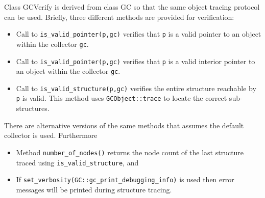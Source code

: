    Class {\sf GCVerify} is derived from class {\sf GC} so that the
same object tracing protocol can be used.  Briefly, three different methods 
are provided for verification:
\begin{itemize}
   \item Call to \verb|is_valid_pointer(p,gc)| verifies that
    \verb|p| is a valid pointer to an object within the collector \verb|gc|. 
   \item Call to \verb|is_valid_pointer(p,gc)| verifies that
    \verb|p| is a valid interior pointer to an object 
     within the collector \verb|gc|. 
   \item Call to \verb|is_valid_structure(p,gc)| verifies the entire
     structure reachable by \verb|p| is valid.  This method uses
     \verb|GCObject::trace| to locate the correct sub-structures.
\end{itemize}

   There are alternative versions of the same methods that assumes
the default collector is used.   Furthermore
\begin{itemize}
   \item Method \verb|number_of_nodes()| returns the node count of the
last structure traced using \verb|is_valid_structure|, and 
   \item If \verb|set_verbosity(GC::gc_print_debugging_info)| is used
then error messages will be printed during structure tracing.
\end{itemize}

   

